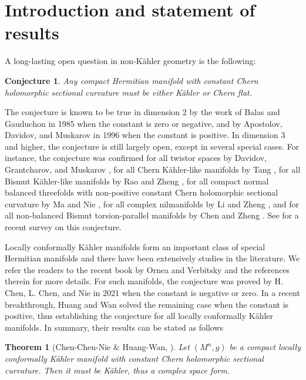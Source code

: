 \documentclass{amsart}
\newtheorem{theorem}{Theorem}%
\newtheorem{conjecture}{Conjecture}
\numberwithin{equation}{section}
\begin{document}
\tableofcontents

\section{Introduction and statement of results}\label{intro}


A long-lasting open question in non-K\"ahler geometry is the following:


\begin{conjecture} \label{conj1}
Any compact Hermitian manifold with constant Chern holomorphic sectional curvature must be either K\"ahler or Chern flat.
\end{conjecture}

The conjecture is known to be true in dimension 2 by the work of Balas and Gauduchon \cite{Balas, BG} in 1985 when the constant is zero or negative, and by Apostolov, Davidov, and Muskarov \cite{ADM} in 1996 when the constant is positive. In dimension 3 and higher, the conjecture is still largely open, except in several special cases. For instance, the conjecture was confirmed for all twistor spaces by Davidov, Grantcharov, and Muskarov \cite{DGM}, for all Chern K\"ahler-like manifolds by Tang \cite{Tang}, for all Bismut K\"ahler-like manifolds by Rao and Zheng \cite{RaoZ}, for all compact normal balanced threefolds with non-positive constant Chern holomorphic sectional curvature by Ma and Nie \cite{MaN},  for all complex nilmanifolds by Li and Zheng \cite{LiZ},  and for all non-balanced Bismut torsion-parallel manifolds by Chen and Zheng \cite{ChenZ26}. See \cite{Zheng} for a recent survey on this conjecture.

Locally conformally K\"ahler  manifolds form an important class of  special Hermitian manifolds and there have been extensively studies in the literature. We refer the readers to the recent book by Ornea and Verbitsky \cite{OV} and the references therein for more details. For such  manifolds, the conjecture was proved by H. Chen, L. Chen, and Nie \cite{CCN} in 2021 when the constant is negative or zero. In a recent breakthrough, Huang and Wan \cite{HW} solved the remaining case when the constant is positive, thus establishing the conjecture for all locally conformally K\"ahler manifolds. In summary, their results can be stated as follows

\begin{theorem}[Chen-Chen-Nie \& Huang-Wan, \cite{CCN,HW}] \label{thm0}
Let $(M^n,g)$ be a compact locally conformally K\"ahler manifold with constant Chern holomorphic sectional curvature. Then it must be K\"ahler, thus a complex space form.
\end{theorem}
\end{document}

